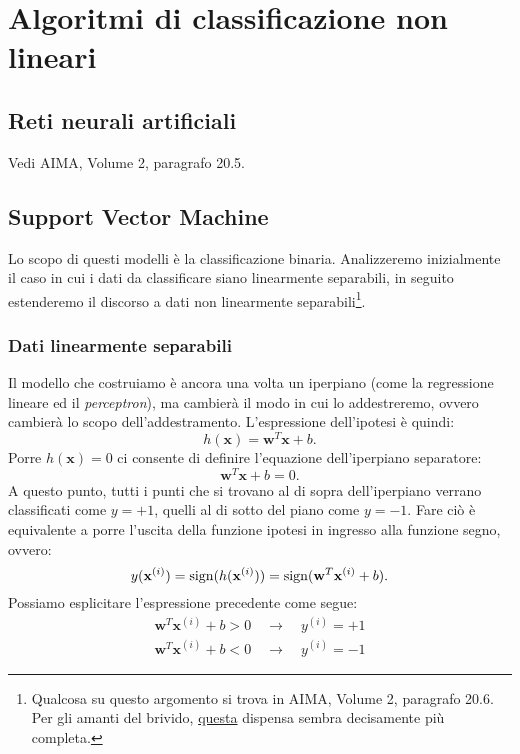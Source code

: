 \section{Algoritmi di classificazione non lineari}
\subsection{Reti neurali artificiali}
Vedi AIMA, Volume 2, paragrafo 20.5.

\subsection{Support Vector Machine}
Lo scopo di questi modelli è la classificazione binaria. Analizzeremo inizialmente il caso in cui i dati da classificare siano linearmente separabili, in seguito estenderemo il discorso a dati non linearmente separabili\footnote{Qualcosa su questo argomento si trova in AIMA, Volume 2, paragrafo 20.6. Per gli amanti del brivido, \href{http://www.disp.uniroma2.it/users/piccialli/svm_sciandrone.pdf}{questa} dispensa sembra decisamente più completa.}.

\subsubsection{Dati linearmente separabili}
Il modello che costruiamo è ancora una volta un iperpiano (come la regressione lineare ed il \emph{perceptron}), ma cambierà il modo in cui lo addestreremo, ovvero cambierà lo scopo dell'addestramento. L'espressione dell'ipotesi è quindi:
\begin{equation*}
h(\mathbf{x}) = \mathbf{w}^T \mathbf{x} + b.
\end{equation*}
Porre $h(\mathbf{x})=0$ ci consente di definire l'equazione dell'iperpiano separatore:
\begin{equation*}
\mathbf{w}^T \mathbf{x} + b = 0.
\end{equation*}
A questo punto, tutti i punti che si trovano al di sopra dell'iperpiano verrano classificati come $y=+1$, quelli al di sotto del piano come $y=-1$. Fare ciò è equivalente a porre l'uscita della funzione ipotesi in ingresso alla funzione segno, ovvero:
\begin{equation*}
y(\mathbf{x}^{(i)}) = \operatorname*{sign}(h(\mathbf{x}^{(i)})) = \operatorname*{sign}(\mathbf{w}^T \mathbf{x}^{(i)} + b).
\end{equation*}
Possiamo esplicitare l'espressione precedente come segue:
\begin{gather*}
\mathbf{w}^T \mathbf{x}^{(i)} + b > 0 \quad \rightarrow \quad y^{(i)} = +1 \\
\mathbf{w}^T \mathbf{x}^{(i)} + b < 0 \quad \rightarrow \quad y^{(i)} = -1 
\end{gather*}

